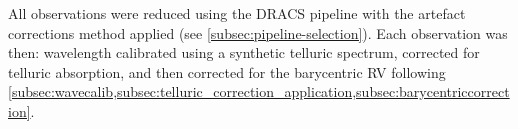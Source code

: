 \begin{landscape}
    
\end{landscape}

All observations were reduced using the {DRACS} pipeline with the artefact corrections method applied (see \cref{subsec:pipeline-selection}).
Each observation was then: wavelength calibrated using a synthetic telluric spectrum, corrected for telluric absorption, and then corrected for the barycentric {RV} following  \cref{subsec:wavecalib,subsec:telluric_correction_application,subsec:barycentriccorrection}.

